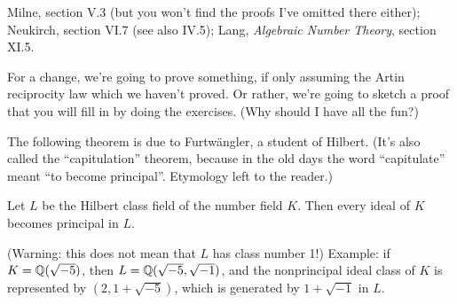 %
%
%
%
%
%
%

Milne, section V.3 (but you won't find the proofs I've omitted there either);
Neukirch, section VI.7 (see also IV.5); 
Lang, \textit{Algebraic Number Theory}, section XI.5.

\medskip
For a change, we're going to prove something, if only assuming the
Artin reciprocity law which we haven't proved. Or rather, we're going to sketch
a proof that you will fill in by doing the exercises. (Why should I have all
the fun?)

The following theorem
is due to Furtw\"angler, a student of Hilbert. (It's also called the
``capitulation'' theorem, because in the old days the word ``capitulate''
meant ``to become principal''. Etymology left to the reader.)
\begin{theorem} \label{T:principal ideal theorem}
Let $L$ be the Hilbert class field of the number field $K$. Then
every ideal of $K$ becomes principal in $L$.
\end{theorem}
(Warning: this does not mean that $L$ has class number 1!)
Example: if $K = \mathbb{Q}(\sqrt{-5})$, then $L = \mathbb{Q}(\sqrt{-5}, \sqrt{-1})$,
and the nonprincipal ideal class of $K$ is represented by $(2, 1+\sqrt{-5})$,
which is generated by $1+\sqrt{-1}$ in $L$.

